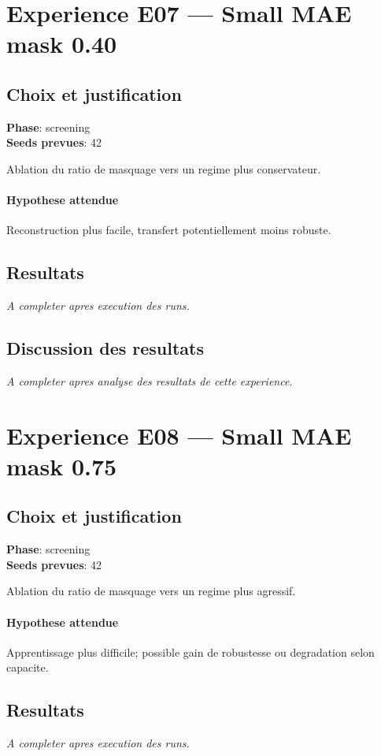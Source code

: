 \documentclass[11pt,a4paper]{article}
\begin{document}
\section{Experience E07 --- Small MAE mask 0.40}
\subsection{Choix et justification}
\textbf{Phase}: screening\\
\textbf{Seeds prevues}: 42

Ablation du ratio de masquage vers un regime plus conservateur.

\paragraph{Hypothese attendue}
Reconstruction plus facile, transfert potentiellement moins robuste.

\subsection{Resultats}
\textit{A completer apres execution des runs.}

\subsection{Discussion des resultats}
\textit{A completer apres analyse des resultats de cette experience.}


\section{Experience E08 --- Small MAE mask 0.75}
\subsection{Choix et justification}
\textbf{Phase}: screening\\
\textbf{Seeds prevues}: 42

Ablation du ratio de masquage vers un regime plus agressif.

\paragraph{Hypothese attendue}
Apprentissage plus difficile; possible gain de robustesse ou degradation selon capacite.

\subsection{Resultats}
\textit{A completer apres execution des runs.}
\end{document}
